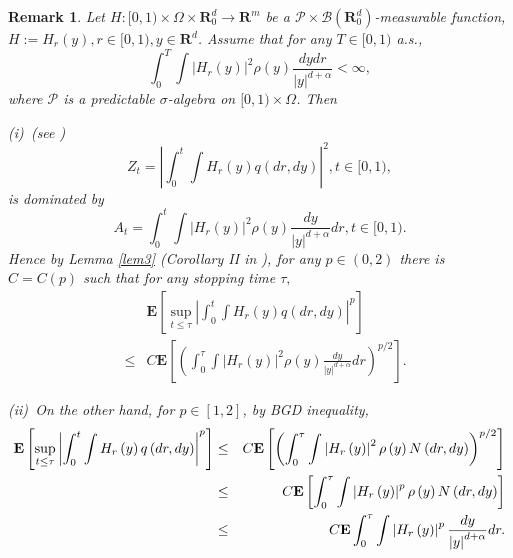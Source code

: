\documentclass[11pt]{amsart}
\theoremstyle{plain}
\newtheorem{remark}{Remark}
\numberwithin{equation}{section}
\begin{document}
\begin{remark}
\label{re1}Let $H:[0,1)\times \Omega \times \mathbf{R}_{0}^{d}\rightarrow 
\mathbf{R}^{m}$ be a $\mathcal{P\times B}\left( \mathbf{R}_{0}^{d}\right) $-measurable function, $H:=H_{r}\left( y\right) ,r\in \lbrack 0,1),y\in 
\mathbf{R}^{d}$. Assume that for any $T\in \lbrack 0,1)$ a.s.,\begin{equation*}
\int_{0}^{T}\int \left\vert H_{r}\left( y\right) \right\vert ^{2}\rho \left(
y\right) \frac{dydr}{\left\vert y\right\vert ^{d+\alpha }}<\infty ,
\end{equation*}where $\mathcal{P}$ is a predictable $\sigma $-algebra on $[0,1)\times
\Omega $. Then

(i)\ (see \cite{le}) 
\begin{equation*}
Z_{t}=\left\vert \int_{0}^{t}\int H_{r}\left( y\right) q\left( dr,dy\right)
\right\vert ^{2},t\in \lbrack 0,1),
\end{equation*}is dominated by\begin{equation*}
A_{t}=\int_{0}^{t}\int \left\vert H_{r}\left( y\right) \right\vert ^{2}\rho
\left( y\right) \frac{dy}{\left\vert y\right\vert ^{d+\alpha }}dr,t\in
\lbrack 0,1).
\end{equation*}Hence by Lemma \ref{lem3} (Corollary II in \cite{le}), for any $p\in \left(
0,2\right) $ there is $C=C\left( p\right) $ such that for any stopping time $\tau ,$\begin{eqnarray*}
&&\mathbf{E}\left[ \sup_{t\leq \tau }\left\vert \int_{0}^{t}\int H_{r}\left(
y\right) q\left( dr,dy\right) \right\vert ^{p}\right] \\
&\leq &C\mathbf{E}\left[ \left( \int_{0}^{\tau }\int \left\vert H_{r}\left(
y\right) \right\vert ^{2}\rho \left( y\right) \frac{dy}{\left\vert
y\right\vert ^{d+\alpha }}dr\right) ^{p/2}\right] .
\end{eqnarray*}

(ii)\ On the other hand, for $p\in \left[ 1,2\right] $, by BGD inequality, 
\begin{eqnarray}
\mathbf{E}\left[ \sup_{t\leq \tau }\left\vert \int_{0}^{t}\int H_{r}\left(
y\right) q\left( dr,dy\right) \right\vert ^{p}\right] &\leq &C\mathbf{E}\left[ \left( \int_{0}^{\tau }\int \left\vert H_{r}\left( y\right)
\right\vert ^{2}\rho \left( y\right) N\left( dr,dy\right) \right) ^{p/2}\right]  \label{ff1} \\
&\leq &C\mathbf{E}\left[ \int_{0}^{\tau }\int \left\vert H_{r}\left(
y\right) \right\vert ^{p}\rho \left( y\right) N\left( dr,dy\right) \right] 
\notag \\
&\leq &C\mathbf{E}\int_{0}^{\tau }\int \left\vert H_{r}\left( y\right)
\right\vert ^{p}\frac{dy}{\left\vert y\right\vert ^{d+\alpha }}dr.  \notag
\end{eqnarray}
\end{remark}
\end{document}
